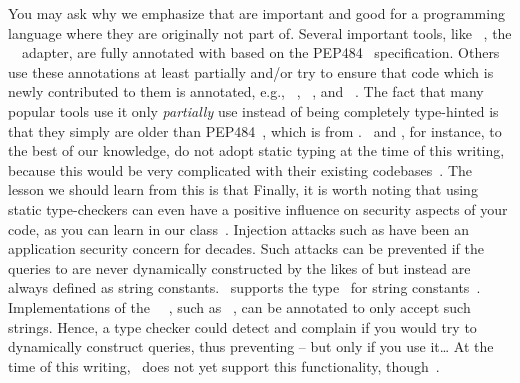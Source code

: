 You may ask why we emphasize that  are important and good for a programming language where they are originally not part of.
Several important tools, like \psycopg~\cite{VDGE2022PPDAFP:ST}, the \postgresql\ \python\ adapter, are fully annotated with  based on the PEP484~\cite{PEP484} specification.
Others use these annotations at least partially and/or try to ensure that code which is newly contributed to them is annotated, e.g., \matplotlib~\cite{HDFDM2012MVWP:CG}, \numpy~\cite{N2025N:TNT}, and \pandas~\cite{PD2025P:CTTCB}.
The fact that many popular tools use it only \emph{partially} use instead of being completely type-hinted is that they simply are older than PEP484~\cite{PEP484}, which is from \citeyear{PEP484}.
\scikitlearn\ and \scipy, for instance, to the best of our knowledge, do not adopt static typing at the time of this writing, because this would be very complicated with their existing codebases~\cite{CFNYLH2020ST,DPVPCHG2018ATHFS}.
The lesson we should learn from this is that%
%
%
%
Finally, it is worth noting that using static type-checkers can even have a positive influence on security aspects of your code, as you can learn in our  class~\cite{databases}.
Injection attacks such as  have been an application security concern for decades.
Such attacks can be prevented if the queries to  are never dynamically constructed by the likes of  but instead are always defined as string constants.
\python\ supports the type~ for string constants~\cite{PEP675}.
Implementations of the \python\ \db\ , such as \psycopg~\cite{VDGE2022PPDAFP:ST}, can be annotated to only accept such strings.
Hence, a type checker could detect and complain if you would try to dynamically construct queries, thus preventing  -- but only if you use it\dots
At the time of this writing, \mypy\ does not yet support this functionality, though~\cite{ZDWVSLS2022I1SP6L,VDGE2022PPDAFP:ST}.
%
\FloatBarrier%
\endhsection%
%
\endhsection%
%
